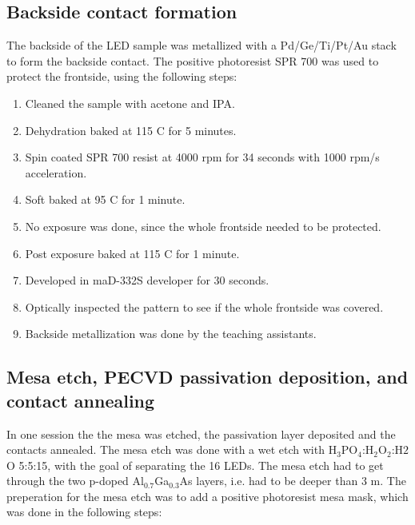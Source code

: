 \subsection{Backside contact formation}
\label{methods:backside_metallization}
\noindent The backside of the LED sample was metallized with a Pd/Ge/Ti/Pt/Au stack to form the backside contact.
The positive photoresist SPR 700 was used to protect the frontside, using the following steps:
\begin{enumerate}
    \item Cleaned the sample with acetone and IPA.
    \item Dehydration baked at 115 \textdegree C for 5 minutes.
    \item Spin coated SPR 700 resist at 4000 rpm for 34 seconds with 1000 rpm/s acceleration.
    \item Soft baked at 95 \textdegree C for 1 minute.
    \item No exposure was done, since the whole frontside needed to be protected.
    \item Post exposure baked at 115 \textdegree C for 1 minute.
    \item Developed in maD-332S developer for 30 seconds.
    \item Optically inspected the pattern to see if the whole frontside was covered.
    \item Backside metallization was done by the teaching assistants.
\end{enumerate}


\subsection{Mesa etch, PECVD passivation deposition, and contact annealing}
\label{methods:PECVD}
\noindent In one session the the mesa was etched, the passivation layer deposited and the contacts annealed.
The mesa etch was done with a wet etch with H$_3$PO$_4$:H$_2$O$_2$:H$2$O 5:5:15, with the goal of separating the 16 LEDs.
The mesa etch had to get through the two p-doped Al$_{0.7}$Ga$_{0.3}$As layers, i.e. had to be deeper than 3 \textmu m.
The preperation for the mesa etch was to add a positive photoresist mesa mask, which was done in the following steps:

